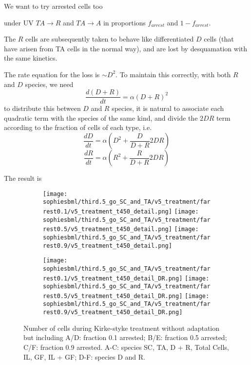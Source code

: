 \documentclass[a4paper,10pt]{report}
\newcommand{\psortbase}{/home/ngrs2/work/bsu/PSORT_Zuliani_Reynolds/}
\newcommand{\sbmlbase}{\psortbase/sbml-sh/}
\newcommand{\sophiesbml}{\sbmlbase/sophie_like}
\begin{document}
We want to try arrested cells too

under UV $TA \rightarrow R$ and $TA \rightarrow A$ in proportions $f_{arrest}$ and $1-f_{arrest}$.

The $R$ cells are subsequently taken to behave like differentiated $D$ cells (that have arisen from TA cells in the normal way), and are lost by desquamation with the same kinetics. 

The rate equation for the loss is $\sim D^2$. To maintain this correctly, with both $R$ and $D$ species, we need 
\[ 
\frac{d(D+R)}{dt} = \alpha (D+R)^2
\]
to distribute this between $D$ and $R$ species, it is natural to associate each quadratic term with the species of the same kind, and divide the $2DR$ term according to the fraction of cells of each type, i.e.
\[
\frac{dD}{dt} = \alpha (D^2 + \frac{D}{D+R} 2DR) 
\]
\[
\frac{dR}{dt} = \alpha (R^2 + \frac{R}{D+R} 2DR) 
\]


The result is 
\begin{figure}[h!]

  \begin{subfigure}{\textwidth}
    \subcaptionbox{}
    {\texttt{[image: \\sophiesbml/third.5\_go\_SC\_and\_TA/v5\_treatment/farrest0.1/v5\_treatment\_t450\_detail.png]}}
    \subcaptionbox{}
    {\texttt{[image: \\sophiesbml/third.5\_go\_SC\_and\_TA/v5\_treatment/farrest0.5/v5\_treatment\_t450\_detail.png]}}
    \subcaptionbox{}
    {\texttt{[image: \\sophiesbml/third.5\_go\_SC\_and\_TA/v5\_treatment/farrest0.9/v5\_treatment\_t450\_detail.png]}}
  \end{subfigure}

  \begin{subfigure}{\textwidth}
    \subcaptionbox{}
    {\texttt{[image: \\sophiesbml/third.5\_go\_SC\_and\_TA/v5\_treatment/farrest0.1/v5\_treatment\_t450\_detail\_DR.png]}}
    \subcaptionbox{}
    {\texttt{[image: \\sophiesbml/third.5\_go\_SC\_and\_TA/v5\_treatment/farrest0.5/v5\_treatment\_t450\_detail\_DR.png]}}
    \subcaptionbox{}
    {\texttt{[image: \\sophiesbml/third.5\_go\_SC\_and\_TA/v5\_treatment/farrest0.9/v5\_treatment\_t450\_detail\_DR.png]}}
  \end{subfigure}

  \caption{Number of cells during Kirke-styke treatment without adaptation but including 
A/D: fraction 0.1 arrested; B/E: fraction 0.5 arrested; C/F: fraction 0.9 arrested. A-C: species SC, TA, D + R, Total Cells, IL, GF, IL + GF; D-F: species D and R.}

  \label{fig:thirdpoint5sophie_treatment_totc}
\end{figure}
\end{document}
